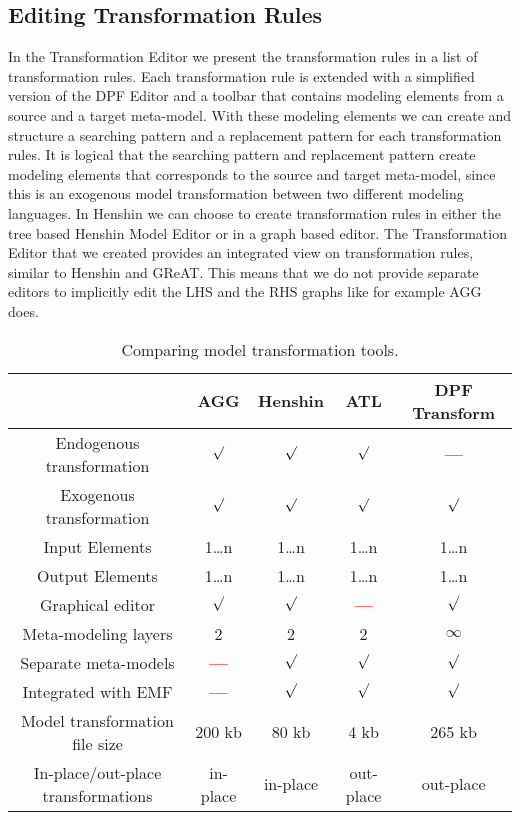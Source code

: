 \subsection{Editing Transformation Rules}

In the Transformation Editor we present the transformation rules in a list of
transformation rules. Each transformation rule is extended with a simplified
version of the DPF Editor and a toolbar that contains modeling elements from a
source and a target meta-model. With these modeling elements we can create and
structure a searching pattern and a replacement pattern for each transformation
rules. It is logical that the searching pattern and replacement pattern create
modeling elements that corresponds to the source and target meta-model, since
this is an exogenous model transformation between two different modeling
languages. In Henshin we can choose to create transformation rules in either the
tree based Henshin Model Editor or in a graph based editor. The Transformation
Editor that we created provides an integrated view on transformation rules,
similar to Henshin and GReAT\cite{GReAT}. This means that we do not provide
separate editors to implicitly edit the LHS and the RHS graphs like for
example AGG does. 

\begin{table}[ht]
\renewcommand*\arraystretch{1.2}
\centering
\begin{tabular}{| c | c | c | c | c |}
\hline
& AGG & Henshin & ATL & DPF Transform \\
\hline
Endogenous transformation & $\surd$ & $\surd$ & $\surd$ & \textcolor{red}{\textbf{---}}\\

Exogenous transformation & $\surd$ & $\surd$ & $\surd$ & $\surd$\\

Input Elements & 1\ldots n & 1\ldots n & 1\ldots n & 1\ldots n\\

Output Elements & 1\ldots n & 1\ldots n & 1\ldots n & 1\ldots n\\

Graphical editor & $\surd$ & $\surd$ & \textcolor{red}{\textbf{---}} & $\surd$
\\

Meta-modeling layers & 2 & 2 & 2 & $\infty$ \\

Separate meta-models & \textcolor{red}{\textbf{---}} &  $\surd$ &  $\surd$ &  $\surd$ \\

Integrated with EMF & \textcolor{red}{\textbf{---}} & $\surd$ & $\surd$ & $\surd$ \\ 

Model transformation file size & 200 kb & 80 kb & 4 kb & 265 kb\\

In-place/out-place transformations & in-place &
in-place & out-place  & out-place \\

\hline
\end{tabular}
\caption{Comparing model transformation tools.}
\label{tab:comparing}
\end{table} 

